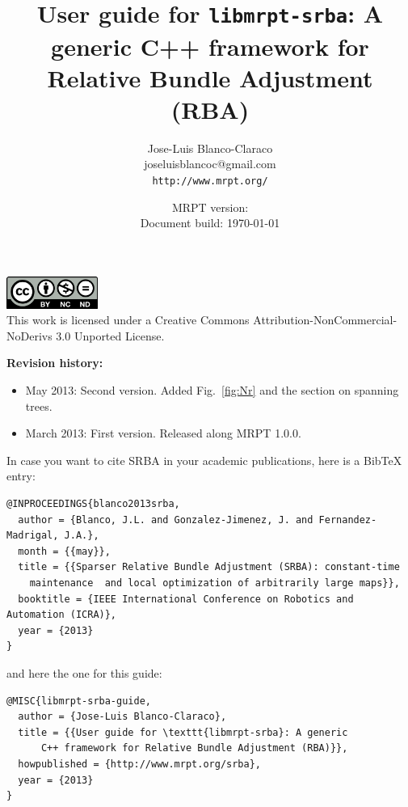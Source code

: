 \documentclass[a4paper,11pt]{article}
\title{User guide for \texttt{libmrpt-srba}: A generic C++ framework for Relative Bundle Adjustment (RBA)}
\author{Jose-Luis Blanco-Claraco \\ joseluisblancoc@gmail.com \\ \texttt{http://www.mrpt.org/} }
\date{MRPT version: \MRPTVERSION \\ Document build: \today }
\begin{document}
\maketitle


\vfill

\begin{scriptsize}
\begin{center}
\includegraphics[width=3cm]{imgs/by-nc-nd-eu.pdf}
\\
This work is licensed under a Creative Commons Attribution-NonCommercial-NoDerivs 3.0 Unported License.
\end{center}
\end{scriptsize}

\vspace{1cm}

\newpage

\textbf{Revision history:}
\begin{itemize}
 \item May 2013: Second version. Added Fig.~\ref{fig:Nr} and the section on spanning trees.
 \item March 2013: First version. Released along MRPT 1.0.0.
\end{itemize}

\vfill


\begin{small}
In case you want to cite SRBA in your academic publications, here is a BibTeX entry: 

\begin{verbatim}
@INPROCEEDINGS{blanco2013srba,
  author = {Blanco, J.L. and Gonzalez-Jimenez, J. and Fernandez-Madrigal, J.A.},
  month = {{may}},
  title = {{Sparser Relative Bundle Adjustment (SRBA): constant-time 
    maintenance  and local optimization of arbitrarily large maps}},
  booktitle = {IEEE International Conference on Robotics and Automation (ICRA)},
  year = {2013}
}
\end{verbatim} 

\noindent and here the one for this guide:

\begin{verbatim}
@MISC{libmrpt-srba-guide,
  author = {Jose-Luis Blanco-Claraco},
  title = {{User guide for \texttt{libmrpt-srba}: A generic 
      C++ framework for Relative Bundle Adjustment (RBA)}},
  howpublished = {http://www.mrpt.org/srba},
  year = {2013}
} 
\end{verbatim} 

\end{small}
\end{document}
